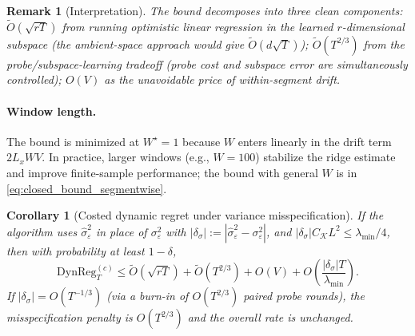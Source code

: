 \documentclass{article}
\newcommand{\DynReg}{\mathrm{DynReg}}
\newtheorem{corollary}{Corollary}
\newtheorem{remark}{Remark}
\begin{document}
\begin{remark}[Interpretation]
The bound decomposes into three clean components:
$\widetilde O(\sqrt{rT})$ from running optimistic linear regression in the learned $r$-dimensional subspace (the ambient-space approach would give $\widetilde O(d\sqrt{T})$);
$\widetilde O(T^{2/3})$ from the probe/subspace-learning tradeoff (probe cost and subspace error are simultaneously controlled);
$O(V)$ as the unavoidable price of within-segment drift.
\end{remark}

\paragraph{Window length.}
The bound is minimized at $W^\star = 1$ because $W$ enters linearly in the drift term $2L_x W V$. In practice, larger windows (e.g., $W = 100$) stabilize the ridge estimate and improve finite-sample performance; the bound with general $W$ is in \eqref{eq:closed_bound_segmentwise}.

\begin{corollary}[Costed dynamic regret under variance misspecification]
\label{cor:regret_misspecified_variance}
If the algorithm uses $\hat\sigma_\varepsilon^2$ in place of $\sigma_\varepsilon^2$ with $|\delta_\sigma| := |\hat\sigma_\varepsilon^2 - \sigma_\varepsilon^2|$, and $|\delta_\sigma|C_{\mathcal K}L^2 \le \lambda_{\min}/4$, then with probability at least $1-\delta$,
\[
\DynReg_T^{(c)} \le \widetilde O(\sqrt{rT}) + \widetilde O(T^{2/3}) + O(V) + O\!\left(\frac{|\delta_\sigma|T}{\lambda_{\min}}\right).
\]
If $|\delta_\sigma| = O(T^{-1/3})$ (via a burn-in of $O(T^{2/3})$ paired probe rounds), the misspecification penalty is $O(T^{2/3})$ and the overall rate is unchanged.
\end{corollary}
\end{document}
